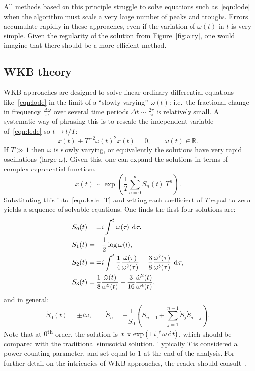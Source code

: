 All methods based on this principle struggle to solve equations such as~\eqref{eqn:lode} when the algorithm must scale a very large number of peaks and troughs. Errors accumulate rapidly in these approaches, even if the variation of \(\omega(t)\) in \(t\) is very simple. Given the regularity of the solution from Figure~\ref{fig:airy}, one would imagine that there should be a more efficient method.


\subsection{WKB theory}
\label{sec:wkb}
WKB approaches are designed to solve linear ordinary differential equations like~\eqref{eqn:lode} in the limit of a ``slowly varying'' \(\omega(t)\): i.e.\ the fractional change in frequency \(\frac{\Delta\omega}{\omega}\) over several time periods \(\Delta t \sim \frac{2\pi}{\omega}\) is relatively small.
A systematic way of phrasing this is to rescale the independent variable of~\eqref{eqn:lode} so \(t\rightarrow t/T\):
\begin{equation}
  \ddot{x}(t) + T^{-2}{\omega(t)}^2x(t) = 0,\qquad \omega(t)\in\mathbb{R}.
  \label{eqn:lode_T}
\end{equation}
If \(T\gg1\) then \(\omega\) is slowly varying, or equivalently the solutions have very rapid oscillations (large \(\omega\)). Given this, one can expand the solutions in terms of complex exponential functions:
\begin{equation}
  x(t)\sim \exp\left( \frac{1}{T}\sum\limits_{n=0}^{\infty} S_n(t)\: T^n \right).
  \label{eqn:asymp}
\end{equation}
Substituting this into~\eqref{eqn:lode_T} and setting each coefficient of \(T\) equal to zero yields a sequence of solvable equations. One finds the first four solutions are:
\begin{align}
  S_0(t) &= \pm i \int^t \omega(\tau)\: \operatorname{d}^{}\!{\tau},
  \label{eqn:S0}\\
  S_1(t) &= -\frac{1}{2}\log \omega(t),\\
  S_2(t) &=  \mp i \int^t \frac{1}{4}\frac{\ddot{\omega}(\tau)}{\omega^{2}(\tau)} - \frac{3}{8}\frac{\dot{\omega}^2(\tau)}{\omega^{3}(\tau)}\: \operatorname{d}^{}\!{\tau}, \\
  S_3(t) &=  \frac{1}{8}\frac{\ddot{\omega}(t)}{\omega^{3}(t)} - \frac{3}{16} \frac{\dot{\omega}^{2}(t)}{\omega^{4}(t)},
\end{align}
and in general:
\begin{equation}
    \dot{S}_0(t) = \pm i \omega, \qquad \dot{S}_n = -\frac{1}{\dot{S}_0} \left( \ddot{S}_{n-1}+ \sum_{j=1}^{n-1}\dot{S}_j\dot{S}_{n-j}  \right).
    \label{eqn:WKB_general}
\end{equation}
Note that at \(0\)\textsuperscript{th} order, the solution is \(x\propto\exp\left(\pm i \int \omega \operatorname{d}^{}\!{t} \right)\), which should be compared with the traditional sinusoidal solution.
Typically \(T\) is considered a power counting parameter, and set equal to \(1\) at the end of the analysis.
For further detail on the intricacies of WKB approaches, the reader should consult~\cite{RHB,Bender+2010}.


